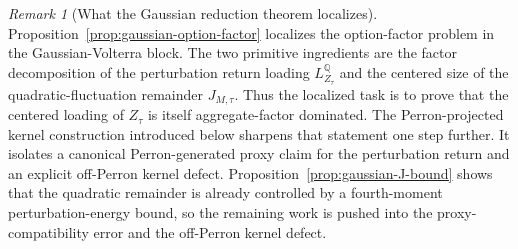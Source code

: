 \documentclass[11pt,a4paper]{amsart}
\theoremstyle{plain}
\theoremstyle{definition}
\theoremstyle{remark}
\newtheorem{remark}[theorem]{Remark}
\newcommand{\QQ}{\mathbb{Q}}
\begin{document}
\begin{remark}[What the Gaussian reduction theorem localizes]
Proposition~\ref{prop:gaussian-option-factor} localizes the option-factor problem in the
Gaussian-Volterra block.  The two primitive ingredients are the factor decomposition of the
perturbation return loading \(L_{Z_\tau}^\QQ\) and the centered size of the quadratic-fluctuation
remainder \(J_{M,\tau}\).  Thus the localized task is
to prove that the centered loading of \(Z_\tau\) is itself aggregate-factor dominated.  The
Perron-projected kernel construction introduced below sharpens that statement one step further.  It
isolates a canonical Perron-generated proxy claim for the perturbation return and an explicit
off-Perron kernel defect.  Proposition~\ref{prop:gaussian-J-bound} shows that the quadratic
remainder is already controlled by a fourth-moment perturbation-energy bound, so the remaining
work is pushed into the proxy-compatibility error and the off-Perron kernel defect.
\end{remark}
\end{document}
